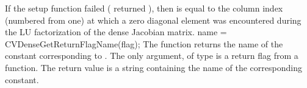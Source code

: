 {
  If the {\cvdense} setup function failed ( returned ),
  then  is equal to the column index (numbered from one) at which
  a zero diagonal element was encountered during the LU factorization of the 
  dense Jacobian matrix.
}
{
  name = CVDenseGetReturnFlagName(flag);
}
{
  The function  returns the
  name of the {\cvdense} constant corresponding to .
}
{
  The only argument, of type  is a return flag from a {\cvdense} function.
}
{
  The return value is a string containing the name of the corresponding constant.
}
{}

